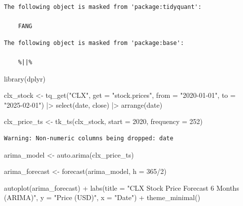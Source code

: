 \documentclass[
  letterpaper,
  DIV=11,
  numbers=noendperiod]{scrartcl}
\newenvironment{Shaded}{\begin{snugshade}}{\end{snugshade}}
\newcommand{\AttributeTok}[1]{\textcolor[rgb]{0.40,0.45,0.13}{#1}}
\newcommand{\DecValTok}[1]{\textcolor[rgb]{0.68,0.00,0.00}{#1}}
\newcommand{\FunctionTok}[1]{\textcolor[rgb]{0.28,0.35,0.67}{#1}}
\newcommand{\NormalTok}[1]{\textcolor[rgb]{0.00,0.23,0.31}{#1}}
\newcommand{\OtherTok}[1]{\textcolor[rgb]{0.00,0.23,0.31}{#1}}
\newcommand{\SpecialCharTok}[1]{\textcolor[rgb]{0.37,0.37,0.37}{#1}}
\newcommand{\StringTok}[1]{\textcolor[rgb]{0.13,0.47,0.30}{#1}}
\begin{document}
\begin{verbatim}
The following object is masked from 'package:tidyquant':

    FANG
\end{verbatim}

\begin{verbatim}
The following object is masked from 'package:base':

    %||%
\end{verbatim}

\begin{Shaded}
\begin{Highlighting}[]
\FunctionTok{library}\NormalTok{(dplyr)}

\NormalTok{clx\_stock }\OtherTok{\textless{}{-}} \FunctionTok{tq\_get}\NormalTok{(}\StringTok{"CLX"}\NormalTok{, }
                   \AttributeTok{get =} \StringTok{"stock.prices"}\NormalTok{, }
                   \AttributeTok{from =} \StringTok{"2020{-}01{-}01"}\NormalTok{, }
                   \AttributeTok{to =} \StringTok{"2025{-}02{-}01"}\NormalTok{) }\SpecialCharTok{|\textgreater{}}
  \FunctionTok{select}\NormalTok{(date, close) }\SpecialCharTok{|\textgreater{}}
  \FunctionTok{arrange}\NormalTok{(date)}

\NormalTok{clx\_price\_ts }\OtherTok{\textless{}{-}} \FunctionTok{tk\_ts}\NormalTok{(clx\_stock, }\AttributeTok{start =} \DecValTok{2020}\NormalTok{, }
              \AttributeTok{frequency =} \DecValTok{252}\NormalTok{)}
\end{Highlighting}
\end{Shaded}

\begin{verbatim}
Warning: Non-numeric columns being dropped: date
\end{verbatim}

\begin{Shaded}
\begin{Highlighting}[]
\NormalTok{arima\_model }\OtherTok{\textless{}{-}} \FunctionTok{auto.arima}\NormalTok{(clx\_price\_ts)}

\NormalTok{arima\_forecast }\OtherTok{\textless{}{-}} \FunctionTok{forecast}\NormalTok{(arima\_model, }\AttributeTok{h =} \DecValTok{365}\SpecialCharTok{/}\DecValTok{2}\NormalTok{)}

\FunctionTok{autoplot}\NormalTok{(arima\_forecast) }\SpecialCharTok{+}
  \FunctionTok{labs}\NormalTok{(}\AttributeTok{title =} \StringTok{"CLX Stock Price Forecast 6 Months (ARIMA)"}\NormalTok{,}
    \AttributeTok{y =} \StringTok{"Price (USD)"}\NormalTok{,}
    \AttributeTok{x =} \StringTok{"Date"}\NormalTok{) }\SpecialCharTok{+}
  \FunctionTok{theme\_minimal}\NormalTok{()}
\end{Highlighting}
\end{Shaded}
\end{document}
